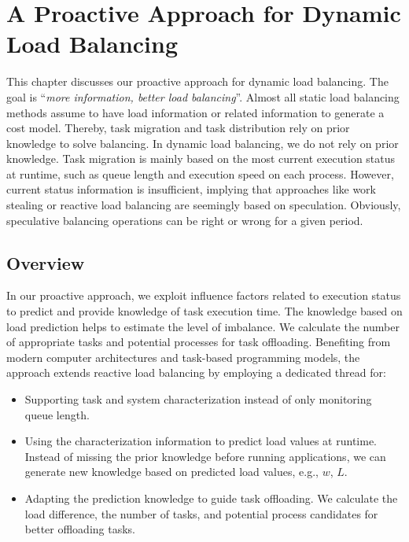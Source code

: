 \chapter{A Proactive Approach for Dynamic Load Balancing}
\label{ch:PADLB}
\chaptertoc
\noindent

This chapter discusses our proactive approach for dynamic load balancing. The goal is ``\textit{more information, better load balancing}''. Almost all static load balancing methods assume to have load information or related information to generate a cost model. Thereby, task migration and task distribution rely on prior knowledge to solve balancing. In dynamic load balancing, we do not rely on prior knowledge. Task migration is mainly based on the most current execution status at runtime, such as queue length and execution speed on each process. However, current status information is insufficient, implying that approaches like work stealing or reactive load balancing are seemingly based on speculation. Obviously, speculative balancing operations can be right or wrong for a given period.\\

\section{Overview}
\label{sec:PADLB-Overview}

In our proactive approach, we exploit influence factors related to execution status to predict and provide knowledge of task execution time. The knowledge based on load prediction helps to estimate the level of imbalance. We calculate the number of appropriate tasks and potential processes for task offloading. Benefiting from modern computer architectures and task-based programming models, the approach extends reactive load balancing by employing a dedicated thread for:

\begin{itemize}
	\item Supporting task and system characterization instead of only monitoring queue length.
	\item Using the characterization information to predict load values at runtime. Instead of missing the prior knowledge before running applications, we can generate new knowledge based on predicted load values, e.g., $w$, $L$.
	\item Adapting the prediction knowledge to guide task offloading. We calculate the load difference, the number of tasks, and potential process candidates for better offloading tasks.
\end{itemize}

